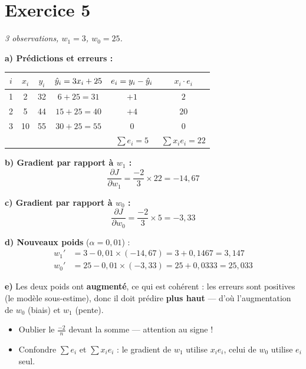\section*{Exercice 5 \hfill \exointermediaire}
\textit{3 observations, $w_1 = 3$, $w_0 = 25$.}

\separateur

\textbf{a) Pr\'{e}dictions et erreurs :}

\begin{center}
\renewcommand{\arraystretch}{1.2}
\begin{tabular}{c|c|c|c|c|c}
    \toprule
    $i$ & $x_i$ & $y_i$ & $\hat{y}_i = 3x_i + 25$ & $e_i = y_i - \hat{y}_i$ & $x_i \cdot e_i$ \\
    \midrule
    1 & 2  & 32 & $6 + 25 = 31$  & $+1$ & $2$ \\
    2 & 5  & 44 & $15 + 25 = 40$ & $+4$ & $20$ \\
    3 & 10 & 55 & $30 + 25 = 55$ & $0$  & $0$ \\
    \midrule
    & & & & $\sum e_i = 5$ & $\sum x_i e_i = 22$ \\
    \bottomrule
\end{tabular}
\end{center}

\textbf{b) Gradient par rapport \`{a} $w_1$ :}
\[
    \frac{\partial J}{\partial w_1} = \frac{-2}{3} \times 22 = \boxed{-14{,}67}
\]

\textbf{c) Gradient par rapport \`{a} $w_0$ :}
\[
    \frac{\partial J}{\partial w_0} = \frac{-2}{3} \times 5 = \boxed{-3{,}33}
\]

\textbf{d) Nouveaux poids} ($\alpha = 0{,}01$) :
\begin{align*}
    w_1' &= 3 - 0{,}01 \times (-14{,}67) = 3 + 0{,}1467 = \boxed{3{,}147} \\
    w_0' &= 25 - 0{,}01 \times (-3{,}33) = 25 + 0{,}0333 = \boxed{25{,}033}
\end{align*}

\textbf{e)} Les deux poids ont \textbf{augment\'{e}}, ce qui est coh\'{e}rent : les erreurs sont positives
(le mod\`{e}le sous-estime), donc il doit pr\'{e}dire \textbf{plus haut} --- d'o\`{u} l'augmentation de $w_0$ (biais)
et $w_1$ (pente).

\begin{attentionbox}
    \begin{itemize}
        \item Oublier le $\frac{-2}{n}$ devant la somme --- attention au signe !
        \item Confondre $\sum e_i$ et $\sum x_i e_i$ : le gradient de $w_1$ utilise $x_i e_i$, celui de $w_0$ utilise $e_i$ seul.
    \end{itemize}
\end{attentionbox}

